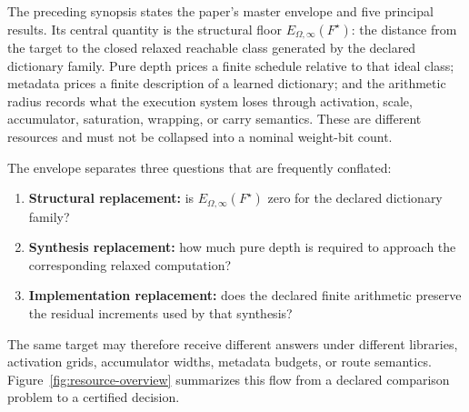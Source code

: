 \documentclass[twoside,11pt]{article}
\begin{document}
The preceding synopsis states the paper's master envelope and five principal
results.  Its central quantity is the structural floor
$E_{\Omega,\infty}(F^\star)$: the distance from the target to the closed
relaxed reachable class generated by the declared dictionary family.  Pure
depth prices a finite schedule relative to that ideal class; metadata prices a
finite description of a learned dictionary; and the arithmetic radius records
what the execution system loses through activation, scale, accumulator,
saturation, wrapping, or carry semantics.  These are different resources and
must not be collapsed into a nominal weight-bit count.

The envelope separates three questions that are frequently conflated:
\begin{enumerate}[leftmargin=1.65em,itemsep=.25em,topsep=.25em]
\item \textbf{Structural replacement:} is $E_{\Omega,\infty}(F^\star)$ zero for
      the declared dictionary family?
\item \textbf{Synthesis replacement:} how much pure depth is required to
      approach the corresponding relaxed computation?
\item \textbf{Implementation replacement:} does the declared finite arithmetic
      preserve the residual increments used by that synthesis?
\end{enumerate}
The same target may therefore receive different answers under different
libraries, activation grids, accumulator widths, metadata budgets, or route
semantics.  Figure~\ref{fig:resource-overview} summarizes this flow from a
declared comparison problem to a certified decision.
\end{document}
